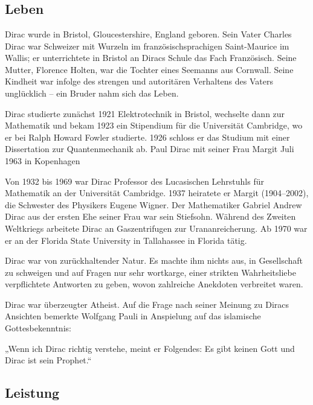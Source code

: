 \chapter{\docname}
\label{\docname}

\section{Leben}

Dirac wurde in Bristol, Gloucestershire, England geboren. Sein Vater Charles Dirac war Schweizer mit Wurzeln im französischsprachigen Saint-Maurice im Wallis; er unterrichtete in Bristol an Diracs Schule das Fach Französisch. Seine Mutter, Florence Holten, war die Tochter eines Seemanns aus Cornwall. Seine Kindheit war infolge des strengen und autoritären Verhaltens des Vaters unglücklich – ein Bruder nahm sich das Leben.

Dirac studierte zunächst 1921 Elektrotechnik in Bristol, wechselte dann zur Mathematik und bekam 1923 ein Stipendium für die Universität Cambridge, wo er bei Ralph Howard Fowler studierte. 1926 schloss er das Studium mit einer Dissertation zur Quantenmechanik ab.
Paul Dirac mit seiner Frau Margit
Juli 1963 in Kopenhagen

Von 1932 bis 1969 war Dirac Professor des Lucasischen Lehrstuhls für Mathematik an der Universität Cambridge. 1937 heiratete er Margit (1904–2002), die Schwester des Physikers Eugene Wigner. Der Mathematiker Gabriel Andrew Dirac aus der ersten Ehe seiner Frau war sein Stiefsohn. Während des Zweiten Weltkriegs arbeitete Dirac an Gaszentrifugen zur Urananreicherung. Ab 1970 war er an der Florida State University in Tallahassee in Florida tätig.

Dirac war von zurückhaltender Natur. Es machte ihm nichts aus, in Gesellschaft zu schweigen und auf Fragen nur sehr wortkarge, einer strikten Wahrheitsliebe verpflichtete Antworten zu geben, wovon zahlreiche Anekdoten verbreitet waren.

Dirac war überzeugter Atheist. Auf die Frage nach seiner Meinung zu Diracs Ansichten bemerkte Wolfgang Pauli in Anspielung auf das islamische Gottesbekenntnis:

„Wenn ich Dirac richtig verstehe, meint er Folgendes: Es gibt keinen Gott und Dirac ist sein Prophet.“





\section{Leistung}


